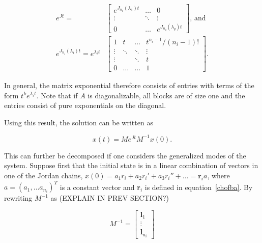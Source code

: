\documentclass[../main.tex]{subfiles}
\begin{document}
\begin{equation}
    \begin{aligned}
        e^{Jt} = &\begin{bmatrix}e^{J_{n_1}(\lambda_1)t} & \dots & 0 \\
                                                         \vdots & \ddots & \vdots \\
                                                         0 & \dots &  e^{J_{n_q}(\lambda_q)t}\end{bmatrix} \text{, and } \\
            e^{J_{n_i}(\lambda_i)t} = e^{\lambda_it} &\begin{bmatrix} 1 & t & \dots & t^{n_i-1}/(n_i-1)! \\
                                                                \vdots  & \ddots & \ddots & \vdots \\
                                                                \vdots & & \ddots& t \\
                                                            0 & \dots & \dots & 1\ \end{bmatrix}.
    \end{aligned}
\end{equation}

In general, the matrix exponential therefore consists of entries with terms of the form $t^ke^{\lambda_it}$. Note that if $A$ is diagonalizable, all blocks are of size one and the entries consist of pure exponentials on the diagonal. 

Using this result, the solution can be written as 

\begin{equation}\label{jordanode}
    x(t) = Me^{Jt}M^{-1}x(0).
\end{equation}

This can further be decomposed if one considers the generalized modes of the system. Suppose first that the initial state is in a linear combination of vectors in one of the Jordan chains, $x(0) = a_1r_i + a_2r_i' + a_3r_i'' + \dots = \boldsymbol{r}_ia$, where $a = (a_1, \dots a_{n_i})^T$ is a constant vector and $\boldsymbol{r}_i$ is defined in equation~\eqref{chofba}. By rewriting $M^{-1}$ as (EXPLAIN IN PREV SECTION?)


\begin{equation}
    M^{-1} = \begin{bmatrix} \boldsymbol{l}_1 \\ \vdots \\ \boldsymbol{l}_{n_i} \end{bmatrix}
\end{equation}
\end{document}
